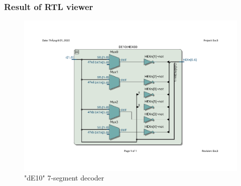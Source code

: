 \documentclass[13pt,a4paper]{report}
\begin{document}
\subsubsection{Result of RTL viewer}
\begin{figure}[H]
\centering
\includegraphics[scale=0.7, clip, trim={2cm 3.5cm 2cm 4cm}]{images/Exc3_HEX_RTL.pdf}
\caption*{"dE10" 7-segment decoder}
\end{figure}
\end{document}
